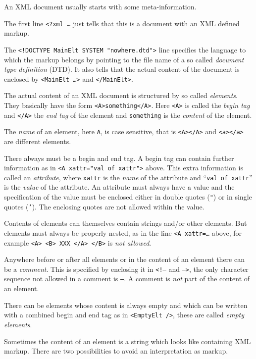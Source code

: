 \documentclass[12pt,openany,a4paper]{book}
\begin{document}
An XML document usually starts with some meta-information.

The first line \texttt{<?xml \ldots} just tells that this is a document with
an XML defined markup.

The \texttt{<!DOCTYPE MainElt SYSTEM "nowhere.dtd">} line specifies the
language to which the markup belongs by pointing to the file name of a so 
called \emph{document type definition} (DTD). It also tells that the actual
content of the document is enclosed by \texttt{<MainElt \ldots>} and
\texttt{</MainElt>}.

The actual content of an XML document is structured by so called
\emph{elements}.  They
basically have the form \texttt{<A>something</A>}. Here \texttt{<A>} is called 
the \emph{begin tag} and \texttt{</A>} the \emph{end tag} of the element and 
\texttt{something} is the \emph{content} of the element.

The \emph{name} of an element, here \texttt{A}, is case sensitive, that is
\texttt{<A></A>} and \texttt{<a></a>} are different elements. 

There always must be a begin and end tag. A begin tag can contain further
information as in \texttt{<A xattr="val of xattr">} above. 
This extra information is called an \emph{attribute}, where
\texttt{xattr} is the \emph{name} of the attribute and ``\texttt{val of
xattr}'' is the \emph{value} of the attribute. An attribute must always
have a value and the specification of the value must be enclosed either
in double quotes (\texttt{"}) or in single quotes (\texttt{'}). The
enclosing quotes are not allowed within the value.

Contents of elements can themselves contain strings and/or other elements. But
elements must always be properly nested, as in the line 
\texttt{<A xattr=\ldots} above, for example \texttt{<A> <B> XXX </A> </B>}
is \emph{not allowed}.

Anywhere before or after all elements or in the content of an element there
can be a \emph{comment}. This is specified by enclosing it in
\texttt{<!--} and \texttt{-->}, the only character sequence not allowed in a
comment is \texttt{--}. A comment is \emph{not} part of the content of an
element. 

There can be elements whose content is always empty and which can be written
with a combined begin and end tag as in \texttt{<EmptyElt />}, these are
called \emph{empty elements}.

Sometimes the content of an element is a string which looks like containing XML 
markup. There are two possibilities to avoid an interpretation as markup.
\end{document}
